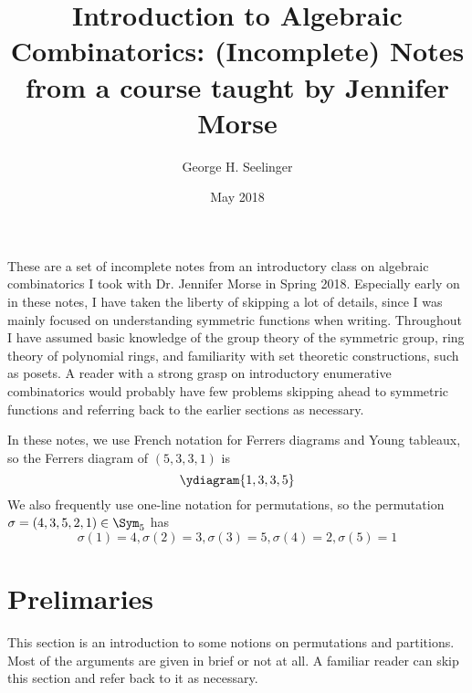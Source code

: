 \documentclass[11pt,leqno,oneside]{amsart}
\title[Algebraic Combinatorics]{Introduction to Algebraic
  Combinatorics: (Incomplete) Notes from a course taught by Jennifer Morse}
\author{George H. Seelinger}
\date{May 2018}
\numberwithin{thm}{section}
\begin{document}
\maketitle
These are a set of incomplete notes from an introductory class on
algebraic combinatorics I took with Dr. Jennifer Morse in Spring
2018. Especially early on in these notes, I have taken the liberty of
skipping a lot of 
details, since I was mainly focused on understanding symmetric
functions when writing. Throughout I have assumed basic knowledge of
the group 
theory of the symmetric group, ring theory of polynomial rings, and
familiarity with set theoretic 
constructions, such as posets. A reader with a strong grasp on
introductory enumerative combinatorics would probably have few
problems skipping ahead to symmetric functions and referring back to
the earlier sections as necessary.

In these notes, we use French notation for Ferrers diagrams and Young
tableaux, so the Ferrers diagram of \((5,3,3,1)\) is \[
  \ydiagram{1,3,3,5}
\]
We also frequently use one-line notation for permutations, so the
permutation \(\sigma = (4,3,5,2,1) \in \Sym_5\) has \[
  \sigma(1) = 4, \sigma(2) = 3, \sigma(3) = 5, \sigma(4) = 2, \sigma(5)=1
\]
\section{Prelimaries}
This section is an introduction to some notions on permutations and partitions. Most
of the arguments are given in brief or not at all. A
familiar reader can skip this section and refer back to it as necessary.
\end{document}

